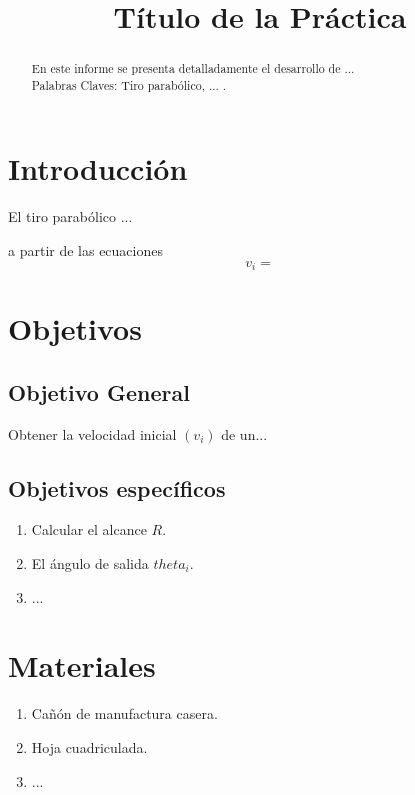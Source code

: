 \documentclass[journal]{IEEEtran}
\title{Título de la Práctica}
\author{
\authorblockA{Nombre 1 \\Nombre 2 \\...\\ Docente: ... \\ 
\today  }}
\begin{document}
\maketitle

\begin{abstract}
En este informe se presenta detalladamente el desarrollo de ...\\

Palabras Claves: Tiro parabólico, ... .
\end{abstract}


\section{Introducción}
 El tiro parabólico ...

 a partir de las ecuaciones 
$$v_i=$$
 


\section{Objetivos}

\subsection{Objetivo General}
Obtener la velocidad inicial $(v_i)$ de un...

\subsection{Objetivos específicos}

\begin{enumerate}
    \item Calcular el alcance $R$. 
    \item El ángulo de salida $theta_i$.
    \item ...
\end{enumerate}


\section{Materiales}

\begin{enumerate}
    \item Cañón de manufactura casera.
    \item Hoja cuadriculada.
    \item ...
\end{enumerate}
\end{document}
